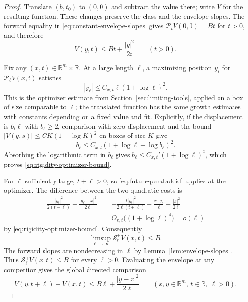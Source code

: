 \documentclass[11pt]{article}
\numberwithin{equation}{section}
\theoremstyle{definition}
\theoremstyle{remark}
\newcommand{\R}{\mathbb{R}}
\newcommand{\Penv}{\mathcal{P}}
\newcommand{\Senv}{\mathcal{S}}
\begin{document}
\begin{proof}
Translate $(b,t_0)$ to $(0,0)$ and subtract the value there; write $V$ for the resulting function. These changes preserve the class and the envelope slopes. The forward equality in \eqref{eq:constant-envelope-slopes} gives $\Penv_tV(0,0)=Bt$ for $t>0$, and therefore
\begin{equation}\label{eq:future-paraboloid}
  V(y,t)\le Bt+\frac{|y|^2}{2t}\qquad(t>0).
\end{equation}

Fix any $(x,t)\in\R^m\times\R$. At a large length $\ell$, a maximizing position $y_\ell$ for $\Penv_\ell V(x,t)$ satisfies
\begin{equation}\label{eq:rigidity-optimizer-bound}
  |y_\ell|\le C_{x,t}\ell(1+\log\ell)^2.
\end{equation}
This is the optimizer estimate from Section~\ref{sec:limiting-tools}, applied on a box of size comparable to $\ell$; the translated function has the same growth estimates with constants depending on a fixed value and fit. Explicitly, if the displacement is $b_\ell\ell$ with $b_\ell\ge2$, comparison with zero displacement and the bound $|V(y,s)|\le C K(1+\log K)^2$ on boxes of size $K$ give
\[
  b_\ell\le C_{x,t}(1+\log\ell+\log b_\ell)^2.
\]
Absorbing the logarithmic term in $b_\ell$ gives $b_\ell\le C_{x,t}'(1+\log\ell)^2$, which proves \eqref{eq:rigidity-optimizer-bound}.

For $\ell$ sufficiently large, $t+\ell>0$, so \eqref{eq:future-paraboloid} applies at the optimizer. The difference between the two quadratic costs is
\begin{align*}
  \frac{|y_\ell|^2}{2(t+\ell)}-\frac{|y_\ell-x|^2}{2\ell}
  &=-\frac{t|y_\ell|^2}{2\ell(t+\ell)}
       +\frac{x\cdot y_\ell}{\ell}-\frac{|x|^2}{2\ell}\\
  &=O_{x,t}\bigl((1+\log\ell)^4\bigr)=o(\ell)
\end{align*}
by \eqref{eq:rigidity-optimizer-bound}. Consequently
\[
  \limsup_{\ell\to\infty}\Senv_\ell^+V(x,t)\le B.
\]
The forward slopes are nondecreasing in $\ell$ by Lemma~\ref{lem:envelope-slopes}. Thus $\Senv_\ell^+V(x,t)\le B$ for every $\ell>0$. Evaluating the envelope at any competitor gives the global directed comparison
\begin{equation}\label{eq:directed-comparison}
  V(y,t+\ell)-V(x,t)\le B\ell+\frac{|y-x|^2}{2\ell}
       \qquad(x,y\in\R^m,\ t\in\R,\ \ell>0).
\end{equation}


\end{proof}
\end{document}
